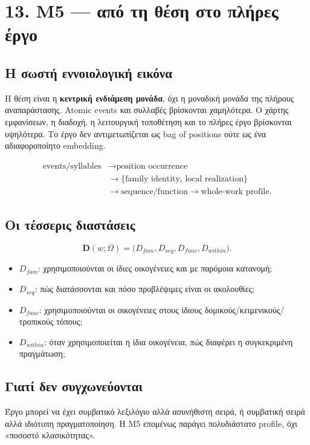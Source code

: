 \documentclass[9pt,a4paper]{extarticle}
\begin{document}
\section*{13. M5 — από τη θέση στο πλήρες έργο}

\subsection*{Η σωστή εννοιολογική εικόνα}
Η θέση είναι η \textbf{κεντρική ενδιάμεση μονάδα}, όχι η μοναδική μονάδα της πλήρους αναπαράστασης. Atomic events και συλλαβές βρίσκονται χαμηλότερα. Ο χάρτης εμφανίσεων, η διαδοχή, η λειτουργική τοποθέτηση και το πλήρες έργο βρίσκονται υψηλότερα. Το έργο δεν αντιμετωπίζεται ως bag of positions ούτε ως ένα αδιαφοροποίητο embedding.

\[
\begin{aligned}
\text{events/syllables} &\rightarrow \text{position occurrence}\\
&\rightarrow \{\text{family identity, local realization}\}\\
&\rightarrow \text{sequence/function}\rightarrow \text{whole-work profile}.
\end{aligned}
\]

\subsection*{Οι τέσσερις διαστάσεις}
\[
\mathbf D(w;\Omega)=
\bigl(D_{fam},D_{seq},D_{func},D_{within}\bigr).
\]
\begin{itemize}
\item \(D_{fam}\): χρησιμοποιούνται οι ίδιες οικογένειες και με παρόμοια κατανομή;
\item \(D_{seq}\): πώς διατάσσονται και πόσο προβλέψιμες είναι οι ακολουθίες;
\item \(D_{func}\): χρησιμοποιούνται οι οικογένειες στους ίδιους δομικούς/κειμενικούς/τροπικούς τόπους;
\item \(D_{within}\): όταν χρησιμοποιείται η ίδια οικογένεια, πώς διαφέρει η συγκεκριμένη πραγμάτωση;
\end{itemize}

\subsection*{Γιατί δεν συγχωνεύονται}
Έργο μπορεί να έχει συμβατικό λεξιλόγιο αλλά ασυνήθιστη σειρά, ή συμβατική σειρά αλλά ιδιότυπη πραγματοποίηση. Η M5 επομένως παράγει πολυδιάστατο profile, όχι «ποσοστό κλασικότητας».
\end{document}
